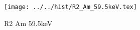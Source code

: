 \begin{figure}[h] \centering\texttt{[image: ../../hist/R2\_Am\_59.5keV.tex]}\caption{R2 Am 59.5keV}\label{hist:R2_Am_59.5keV} \end{figure}
